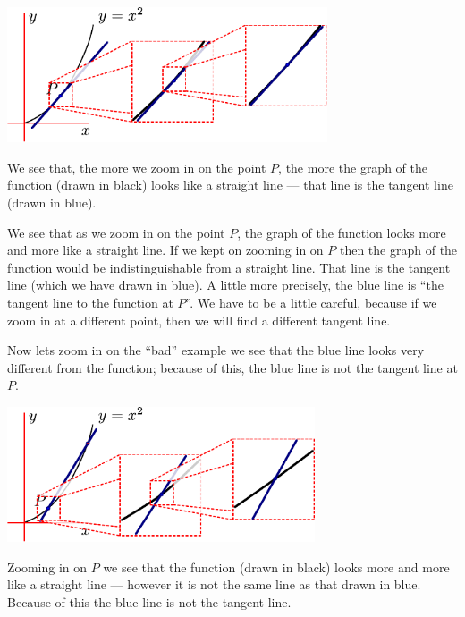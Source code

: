\begin{fig}
\begin{center}
 \includegraphics[height=4cm]{tang1aa}
\end{center}
We see that, the more we zoom in on the point $P$, the more the graph of the function
(drawn in black) looks like a straight line --- that line is the tangent line (drawn in
blue).
\label{fig tang1aa}
\end{fig}
We see that as we zoom in on the point $P$, the graph of the function looks
more and more like a straight line. If we kept on zooming in on $P$ then the
graph of the function would be indistinguishable from a straight line. That
line is the tangent line (which we have drawn in blue). A little more
precisely, the blue line is ``the tangent line to the function at $P$''. We
have to be a little careful, because if we zoom in at a different point, then
we will find a different tangent line.

Now lets zoom in on the ``bad'' example we see that the blue line looks very
different from the function; because of this, the blue line is not the tangent
line at $P$.
\begin{fig}
\begin{center}
 \includegraphics[height=4cm]{tang1ab}
\end{center}
Zooming in on $P$ we see that the function (drawn in black) looks more
and more like a straight line --- however it is not the same line as that drawn
in blue. Because of this the blue line is not the tangent line.
\label{fig tang1ab}
\end{fig}

